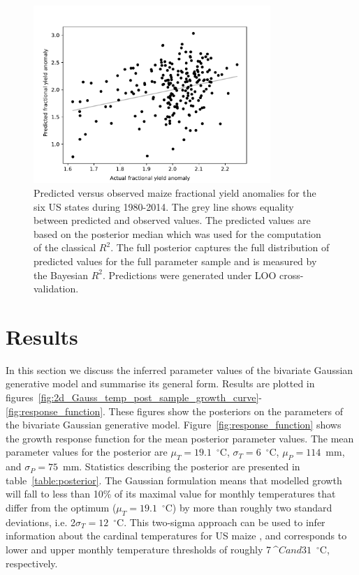 \documentclass[12pt]{iopart}
\newcommand{\add}[1]{#1}
\begin{document}
\begin{figure}
\centering
\includegraphics[width=0.8\textwidth]{./figures/loo_all_states_us_maize_frac_anom}
\caption{\label{fig:cv_plot} Predicted versus observed maize fractional yield anomalies for the six US states during 1980-2014. The grey line shows equality between predicted and observed values. The predicted values are based on the posterior median which was used for the computation of the classical $R^2$. The full posterior captures the full distribution of predicted values for the full parameter sample and is measured by the Bayesian $R^2$. Predictions were generated under LOO cross-validation.}
\end{figure}

\section{Results}
\label{sec:results}
In this section we discuss the inferred parameter values of the bivariate Gaussian generative model and summarise its general form. Results are plotted in figures~\ref{fig:2d_Gauss_temp_post_sample_growth_curve}-\ref{fig:response_function}. These figures show the posteriors on the parameters of the bivariate Gaussian generative model. Figure~\ref{fig:response_function} shows the growth response function for the mean posterior parameter values. The mean parameter values for the posterior are $\mu_T = 19.1$~$^\circ$C, $\sigma_T = 6$~$^\circ$C, $\mu_P = 114$~mm, and $\sigma_P = 75$~mm. Statistics describing the posterior are presented in table~\ref{table:posterior}. \add{The Gaussian formulation means that modelled growth will fall to less than 10\% of its maximal value for monthly temperatures that differ from the optimum ($\mu_T = 19.1$~$^\circ$C) by more than roughly two standard deviations, i.e. 2$\sigma_T = 12$~$^\circ$C. This two-sigma approach can be used to infer information about the cardinal temperatures for US maize \citep[e.g.][]{yin:1995}, and corresponds to lower and upper monthly temperature thresholds of roughly 7$~$^\circ$C and 31$~$^\circ$C, respectively.}
\end{document}
